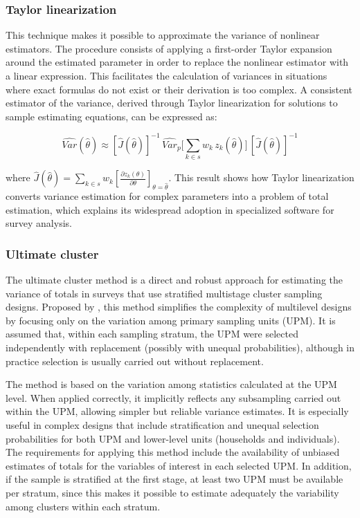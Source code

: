 \documentclass[
  english,
  12pt,
]{book}
\begin{document}
\subsubsection{Taylor linearization}\label{linealizacion-de-taylor}

This technique makes it possible to approximate the variance of nonlinear estimators. The procedure consists of applying a first-order Taylor expansion around the estimated parameter in order to replace the nonlinear estimator with a linear expression. This facilitates the calculation of variances in situations where exact formulas do not exist or their derivation is too complex. A consistent estimator of the variance, derived through Taylor linearization for solutions to sample estimating equations, can be expressed as:

\[
\widehat{Var}(\hat{\theta}) \approx [\hat{J}(\hat{\theta})]^{-1} \, \widehat{Var}_p \Bigg[\sum_{k\in s} w_k\, z_k(\hat{\theta})\Bigg] \, [\hat{J}(\hat{\theta})]^{-1}
\]

where \(\hat{J}(\hat{\theta}) = \sum_{k\in s} w_k \left[ \frac{\partial z_k(\theta)}{\partial \theta} \right]_{\theta=\hat{\theta}}\). This result shows how Taylor linearization converts variance estimation for complex parameters into a problem of total estimation, which explains its widespread adoption in specialized software for survey analysis.

\subsubsection{Ultimate cluster}\label{ultimo-conglomerado}

The ultimate cluster method is a direct and robust approach for estimating the variance of totals in surveys that use stratified multistage cluster sampling designs. Proposed by \citet{hansen1953sample}, this method simplifies the complexity of multilevel designs by focusing only on the variation among primary sampling units (UPM). It is assumed that, within each sampling stratum, the UPM were selected independently with replacement (possibly with unequal probabilities), although in practice selection is usually carried out without replacement.

The method is based on the variation among statistics calculated at the UPM level. When applied correctly, it implicitly reflects any subsampling carried out within the UPM, allowing simpler but reliable variance estimates. It is especially useful in complex designs that include stratification and unequal selection probabilities for both UPM and lower-level units (households and individuals). The requirements for applying this method include the availability of unbiased estimates of totals for the variables of interest in each selected UPM. In addition, if the sample is stratified at the first stage, at least two UPM must be available per stratum, since this makes it possible to estimate adequately the variability among clusters within each stratum.
\end{document}
